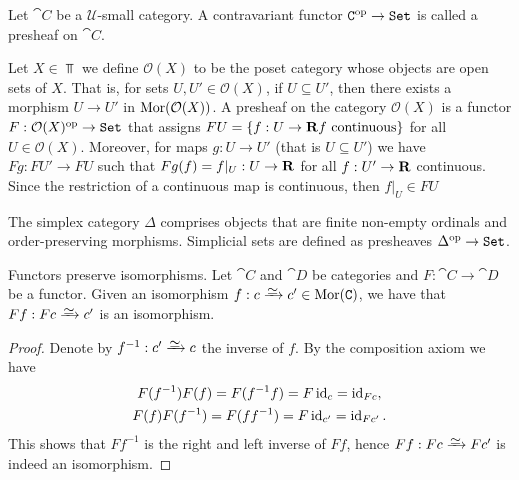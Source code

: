 \begin{definition}[Presheaf]\label{def: presheaf}
    Let \(\cat C\) be a \(\mathcal U\)-small category. A contravariant functor
    \(\texttt C^{\mathrm{op}} \to {\texttt{Set}}\) is called a presheaf on \(\cat C\).
\end{definition}

\begin{example}
    Let \(X \in \Top\) we define \(\mathcal O(X)\) to be the poset category whose
    objects are open sets of \(X\). That is, for sets \(U, U' \in \mathcal O(X)\), if
    \(U \subseteq U'\), then there exists a morphism \(U \to U'\) in
    \(\operatorname{Mor}(\mathcal O(X))\). A presheaf on the category \(\mathcal O(X)\) is a
    functor \(F: \mathcal O(X)^{\mathrm{op}} \to {\texttt{Set}}\) that assigns
    \(F U = \{f: U \to \mathbf{R} \relax f \text{ continuous}\}\) for all
    \(U \in \mathcal O(X)\).  Moreover, for maps \(g: U \to U'\) (that is
    \(U \subseteq U'\)) we have \(F g: F U' \to F U\) such that
    \(F g(f) = f|_U: U \to \mathbf{R}\) for all \(f: U' \to \mathbf{R}\) continuous. Since the
    restriction of a continuous map is continuous, then \(f|_U \in F U\)
\end{example}

\begin{example}
    \label{exp:simplex-category}
    The simplex category \(\Delta\) comprises objects that are finite non-empty
    ordinals and order-preserving morphisms. Simplicial sets are defined as
    presheaves \(\Delta^{\mathrm{op}} \to {\texttt{Set}}\).
\end{example}

\begin{lemma}\label{lem: functor preserve iso}
    Functors preserve isomorphisms. Let \(\cat C\) and \(\cat D\) be categories
    and \(F: \cat C \to \cat D\) be a functor. Given an isomorphism \(f: c \isoto
    c' \in \Mor(\cat C)\), we have that \(F f : F c \isoto c'\) is an isomorphism.
\end{lemma}

\begin{proof}
    Denote by \(f^{-1}: c' \isoto c\) the inverse of \(f\). By the composition
    axiom we have
    \begin{gather*}
        F (f^{-1}) F (f) = F (f^{-1} f) = F \operatorname{id}_c    = \operatorname{id}_{F c}, \\
        F (f) F (f^{-1}) = F (f f^{-1}) = F \operatorname{id}_{c'} = \operatorname{id}_{F c'}.
    \end{gather*}
    This shows that \(F f^{-1}\) is the right and left inverse of \(F f\), hence
    \(F f: F c \isoto F c'\) is indeed an isomorphism.
\end{proof}

